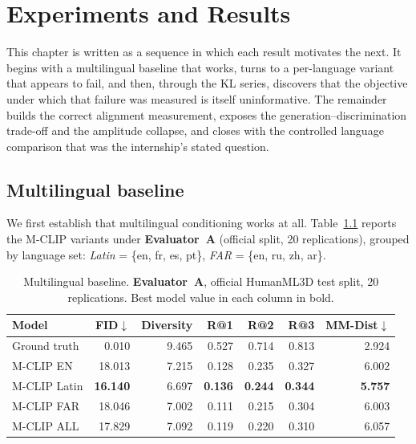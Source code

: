 \documentclass[11pt,a4paper]{report}
\newcommand{\best}[1]{\textbf{#1}}
\begin{document}
\chapter{Experiments and Results}
\label{ch:results}

This chapter is written as a sequence in which each result motivates the
next. It begins with a multilingual baseline that works, turns to a
per-language variant that appears to fail, and then, through the KL
series, discovers that the objective under which that failure was
measured is itself uninformative. The remainder builds the correct
alignment measurement, exposes the generation--discrimination trade-off and
the amplitude collapse, and closes with the controlled language comparison
that was the internship's stated question.

\section{Multilingual baseline}
\label{sec:baseline}

We first establish that multilingual conditioning works at all.
Table~\ref{tab:baseline} reports the M-CLIP variants under
\textbf{Evaluator~A} (official split, 20 replications), grouped by language
set: \emph{Latin} = \{en, fr, es, pt\}, \emph{FAR} = \{en, ru, zh, ar\}.

\begin{table}[H]
\centering
\caption{Multilingual baseline. \textbf{Evaluator~A}, official HumanML3D
test split, 20 replications. Best model value in each column in bold.}
\label{tab:baseline}
\small
\begin{tabular}{@{}lrrrrrr@{}}
\toprule
Model & FID$\downarrow$ & Diversity & R@1 & R@2 & R@3 & MM-Dist$\downarrow$ \\
\midrule
Ground truth   & 0.010  & 9.465 & 0.527 & 0.714 & 0.813 & 2.924 \\
\midrule
M-CLIP EN      & 18.013 & 7.215 & 0.128 & 0.235 & 0.327 & 6.002 \\
M-CLIP Latin   & \best{16.140} & 6.697 & \best{0.136} & \best{0.244} & \best{0.344} & \best{5.757} \\
M-CLIP FAR     & 18.046 & 7.002 & 0.111 & 0.215 & 0.304 & 6.003 \\
M-CLIP ALL     & 17.829 & 7.092 & 0.119 & 0.220 & 0.310 & 6.057 \\
\bottomrule
\end{tabular}
\end{table}
\end{document}
